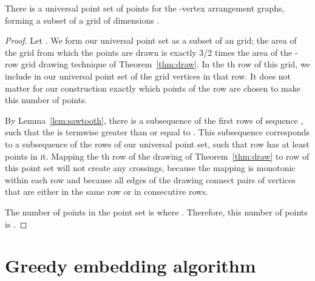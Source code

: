 \documentclass[oribibl]{llncs}
\begin{document}
\begin{theorem}
There is a universal point set of  points for the -vertex arrangement graphs,
forming a subset of a grid of dimensions .
\end{theorem}

\begin{proof}
Let .
We form our universal point set as a subset of an  grid; the area of the grid from which the points are drawn is exactly 3/2 times the area of the -row grid drawing technique of Theorem~\ref{thm:draw}. In the th row of this grid, we include in our universal point set  of the grid vertices in that row. It does not matter for our construction exactly which points of the row are chosen to make this number of points.

By Lemma~\ref{lem:sawtooth}, there is a subsequence  of the first  rows of sequence , such that the  is termwise greater than or equal to . This subsequence corresponds to a subsequence
 of the rows of our universal point set, such that row  has at least  points in it.
Mapping the th row of the drawing of Theorem~\ref{thm:draw} to row  of this point set will not create any crossings, because the mapping is monotonic within each row and because all edges of the drawing connect pairs of vertices that are either in the same row or in consecutive rows.

The number of points in the point set is  where .
Therefore, this number of points is .
\end{proof}

\section{Greedy embedding algorithm}
\end{document}

